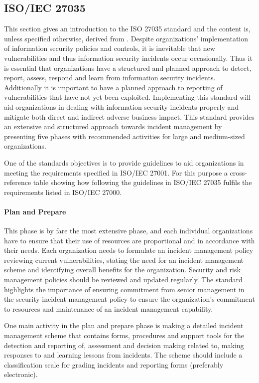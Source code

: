 \subsection{\acs{ISO}/\acs{IEC} 27035}
This section gives an introduction to the ISO 27035 standard and the content is, unless specified otherwise, derived from \cite{ISO/IEC27035}. Despite organizations' implementation of information security policies and controls, it is inevitable that new vulnerabilities and thus information security incidents occur occasionally. Thus it is essential that organizations have a structured and planned approach to detect, report, assess, respond and learn from information security incidents. Additionally it is important to have a planned approach to reporting of vulnerabilities that have not yet been exploited. Implementing this standard will aid organizations in dealing with information security incidents properly and mitigate both direct and indirect adverse business impact. This standard provides an extensive and structured approach towards incident management by presenting five phases with recommended activities for large and medium-sized organizations. 

One of the standards objectives is to provide guidelines to aid organizations in meeting the requirements specified in ISO/IEC 27001. For this purpose a cross-reference table showing how following the guidelines in ISO/IEC 27035 fulfils the requirements listed in ISO/IEC 27000.

\paragraph{Plan and Prepare} This phase is by fare the most extensive phase, and each individual organizations have to ensure that their use of resources are proportional and in accordance with their needs. Each organization needs to formulate an incident management policy reviewing current vulnerabilities, stating the need for an incident management scheme and identifying overall benefits for the organization. Security and risk management policies should be reviewed and updated regularly. The standard highlights the importance of ensuring commitment from senior management in the security incident management policy to ensure the organization's commitment to resources and maintenance of an incident management capability.  

One main activity in the plan and prepare phase is making a detailed incident management scheme that contains forms, procedures and support tools for the detection and reporting of, assessment and decision making related to, making responses to and learning lessons from incidents. The scheme should include a classification scale for grading incidents and reporting forms (preferably electronic).   

